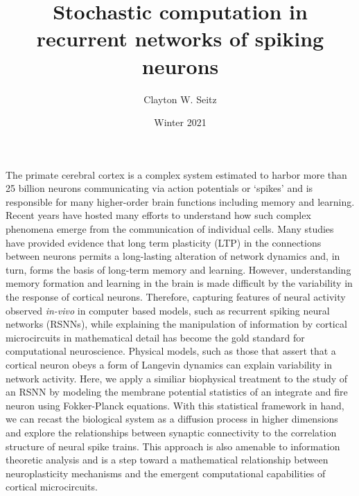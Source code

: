 \documentclass{ucetd}
\title{Stochastic computation in recurrent networks of spiking neurons}
\author{Clayton W. Seitz}
\date{Winter 2021}
\begin{document}
\maketitle

\makecopyright
\makeepigraph


\tableofcontents

\acknowledgments

\abstract

The primate cerebral cortex is a complex system estimated to harbor more than 25 billion neurons communicating via action potentials or `spikes' and is responsible for many higher-order brain functions including memory and learning. Recent years have hosted many efforts to understand how such complex phenomena emerge from the communication of individual cells. Many studies have provided evidence that long term plasticity (LTP) in the connections between neurons permits a long-lasting alteration of network dynamics and, in turn, forms the basis of long-term memory and learning. However, understanding memory formation and learning in the brain is made difficult by the variability in the response of cortical neurons. Therefore, capturing features of neural activity observed \emph{in-vivo} in computer based models, such as recurrent spiking neural networks (RSNNs), while explaining the manipulation of information by cortical microcircuits in mathematical detail has become the gold standard for computational neuroscience. Physical models, such as those that assert that a cortical neuron obeys a form of Langevin dynamics can explain variability in network activity.  Here, we apply a similiar biophysical treatment to the study of an RSNN by modeling the membrane potential statistics of an integrate and fire neuron using Fokker-Planck equations. With this statistical framework in hand, we can recast the biological system as a diffusion process in higher dimensions and explore the relationships between synaptic connectivity to the correlation structure of neural spike trains. This approach is also amenable to information theoretic analysis and is a step toward a mathematical relationship between neuroplasticity mechanisms and the emergent computational capabilities of cortical microcircuits.
\end{document}
